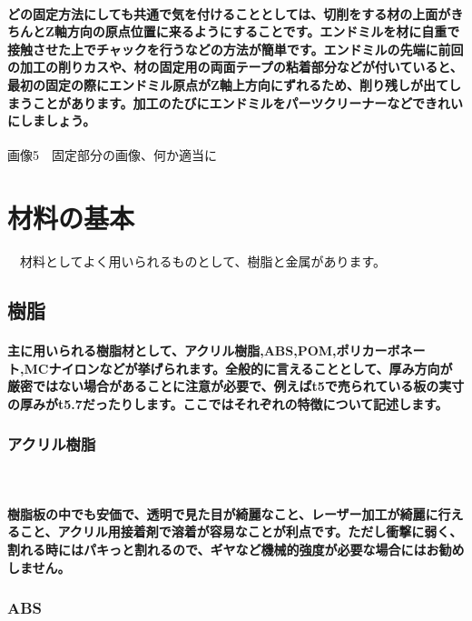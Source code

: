 \documentclass[b5paper, 9pt, twocolumn, titlepage]{jsbook}%
\begin{document}
\paragraph{どの固定方法にしても共通で気を付けることとしては、切削をする材の上面がきちんとZ軸方向の原点位置に来るようにすることです。エンドミルを材に自重で接触させた上でチャックを行うなどの方法が簡単です。エンドミルの先端に前回の加工の削りカスや、材の固定用の両面テープの粘着部分などが付いていると、最初の固定の際にエンドミル原点がZ軸上方向にずれるため、削り残しが出てしまうことがあります。加工のたびにエンドミルをパーツクリーナーなどできれいにしましょう。}

画像5　固定部分の画像、何か適当に

\section{材料の基本}

　材料としてよく用いられるものとして、樹脂と金属があります。

\subsection{樹脂}

\paragraph{主に用いられる樹脂材として、アクリル樹脂,ABS,POM,ポリカーボネート,MCナイロンなどが挙げられます。全般的に言えることとして、厚み方向が厳密ではない場合があることに注意が必要で、例えばt5で売られている板の実寸の厚みがt5.7だったりします。ここではそれぞれの特徴について記述します。}

\subsubsection{アクリル樹脂}

　\paragraph{樹脂板の中でも安価で、透明で見た目が綺麗なこと、レーザー加工が綺麗に行えること、アクリル用接着剤で溶着が容易なことが利点です。ただし衝撃に弱く、割れる時にはパキっと割れるので、ギヤなど機械的強度が必要な場合にはお勧めしません。}

\subsubsection{ABS}
\end{document}
